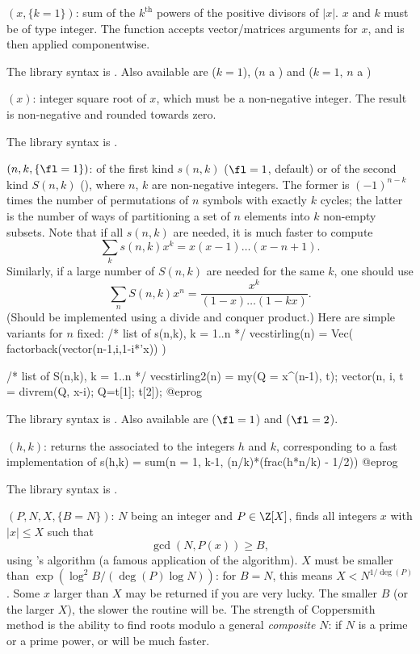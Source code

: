 $(x,\{k=1\})$: \label{se:sigma}sum of the $k^{\text{th}}$ powers of the positive divisors of $|x|$. $x$
and $k$ must be of type integer.
The function accepts vector/matrices arguments for $x$, and is then applied
componentwise.

The library syntax is .
Also available are
 ($k = 1$), 
($n$ a ) and  ($k = 1$, $n$ a )

$(x)$: \label{se:sqrtint}integer square root of $x$, which must be a non-negative integer. The
result is non-negative and rounded towards zero.

The library syntax is .

$(n,k,\{\fl=1\})$: \label{se:stirling} of the first kind $s(n,k)$ ($\fl=1$, default) or
of the second kind $S(n,k)$ (), where $n$, $k$ are non-negative
integers. The former is $(-1)^{n-k}$ times the
number of permutations of $n$ symbols with exactly $k$ cycles; the latter is
the number of ways of partitioning a set of $n$ elements into $k$ non-empty
subsets. Note that if all $s(n,k)$ are needed, it is much faster to compute
$$\sum_k s(n,k) x^k = x(x-1)\dots(x-n+1).$$
Similarly, if a large number of $S(n,k)$ are needed for the same $k$,
one should use
$$\sum_n S(n,k) x^n = \dfrac{x^k}{(1-x)\dots(1-kx)}.$$
(Should be implemented using a divide and conquer product.) Here are
simple variants for $n$ fixed:
\bprog
/* list of s(n,k), k = 1..n */
vecstirling(n) = Vec( factorback(vector(n-1,i,1-i*'x)) )

/* list of S(n,k), k = 1..n */
vecstirling2(n) =
{ my(Q = x^(n-1), t);
  vector(n, i, t = divrem(Q, x-i); Q=t[1]; t[2]);
}
@eprog

The library syntax is .
Also available are 
($\fl=1$) and  ($\fl=2$).

$(h,k)$: \label{se:sumdedekind}returns the  associated to the integers $h$ and $k$,
 corresponding to a fast implementation of
 \bprog
  s(h,k) = sum(n = 1, k-1, (n/k)*(frac(h*n/k) - 1/2))
 @eprog

The library syntax is .

$(P, N, X, \{B=N\})$: \label{se:zncoppersmith}$N$ being an integer and $P\in \Z[X]$, finds all integers $x$ with
$|x| \leq X$ such that
$$\gcd(N, P(x)) \geq B,$$
using 's algorithm (a famous application of the 
algorithm). $X$ must be smaller than $\exp(\log^2 B / (\deg(P) \log N))$:
for $B = N$, this means $X < N^{1/\deg(P)}$. Some $x$ larger than $X$ may
be returned if you are very lucky. The smaller $B$ (or the larger $X$), the
slower the routine will be. The strength of Coppersmith method is the
ability to find roots modulo a general \emph{composite} $N$: if $N$ is a prime
or a prime power,  or  will be much
faster.

